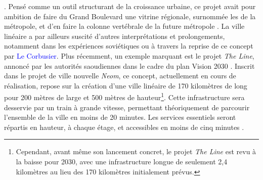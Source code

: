 \begin{refsegment}
{} \textcolor{blue}{\autocite[87]{demangeon_lille-roubaix-tourcoing_1988}}. Pensé comme un outil structurant de la croissance urbaine, ce projet avait pour ambition de faire du Grand Boulevard une vitrine régionale, surnommée les  de la métropole, et d’en faire la colonne vertébrale de la future métropole \textcolor{blue}{\autocite{dubuis__2020}}. La ville linéaire a par ailleurs suscité d’autres interprétations et prolongements, notamment dans les expériences soviétiques ou à travers la reprise de ce concept par \textcolor{blue}{Le Corbusier}. Plus récemment, un exemple marquant est le projet \textsl{The Line}, annoncé par les autorités saoudiennes dans le cadre du plan Vision 2030 \textcolor{blue}{\autocite[139]{arnault_ville_2022}}. Inscrit dans le projet de ville nouvelle \textsl{Neom}, ce concept, actuellement en cours de réalisation, repose sur la création d’une ville linéaire de 170 kilomètres de long pour 200 mètres de large et 500 mètres de hauteur\footnote{
    Cependant, avant même son lancement concret, le projet \textsl{The Line} est revu à la baisse pour 2030, avec une infrastructure longue de seulement 2,4 kilomètres au lieu des 170 kilomètres initialement prévus.
}. Cette infrastructure sera desservie par un train à grande vitesse, permettant théoriquement de parcourir l’ensemble de la ville en moins de 20 minutes. Les services essentiels seront répartis en hauteur, à chaque étage, et accessibles en moins de cinq minutes \textcolor{blue}{\autocite[139]{arnault_ville_2022}}.%


\end{refsegment}
